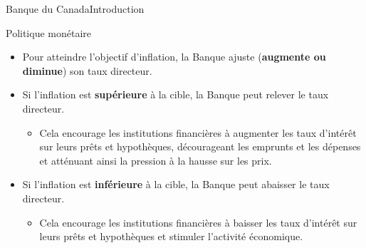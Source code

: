 \documentclass{beamer}
\begin{document}
\begin{frame}{Banque du Canada}{Introduction}
\begin{block}{Politique monétaire}
\begin{itemize}
\item Pour atteindre l'objectif d'inflation, la Banque ajuste (\textbf{augmente ou diminue}) son taux directeur.
\item Si l'inflation est \textbf{supérieure} à la cible, la Banque peut relever le taux directeur.
\begin{itemize}
\item Cela encourage les institutions financières à augmenter les taux d'intérêt sur leurs prêts et hypothèques, décourageant les emprunts et les dépenses et atténuant ainsi la pression à la hausse sur les prix.
\end{itemize}
\item Si l'inflation est \textbf{inférieure} à la cible, la Banque peut abaisser le taux directeur.
\begin{itemize}
\item Cela encourage les institutions financières à baisser les taux d'intérêt sur leurs prêts et hypothèques et stimuler l'activité économique.
\end{itemize}
\end{itemize}
\end{block}



\end{frame}
\end{document}
